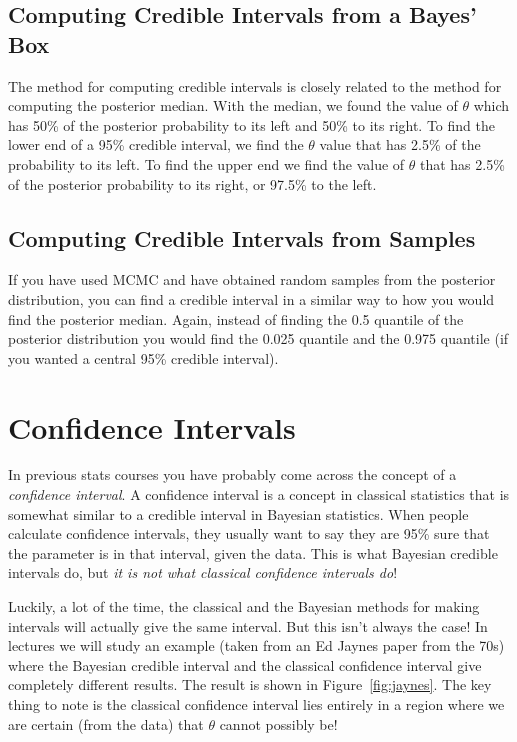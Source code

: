 \subsection{Computing Credible Intervals from a Bayes' Box}
The method for computing credible intervals is closely related to the method
for computing the posterior median. With the median, we found the value of
$\theta$ which has 50\% of the posterior probability to its left and 50\% to its
right. To find the lower end of a 95\% credible interval, we find the $\theta$
value that has 2.5\% of the probability to its left. To find the upper end we
find the value of $\theta$ that has 2.5\% of the posterior probability to its
right, or 97.5\% to the left.

\subsection{Computing Credible Intervals from Samples}
If you have used MCMC and have obtained random samples from the posterior
distribution, you can find a credible interval in a similar way to how you would
find the posterior median. Again, instead of finding the 0.5 quantile of the
posterior distribution you would find the 0.025 quantile and the 0.975 quantile
(if you wanted a central 95\% credible interval).

\section{Confidence Intervals}
In previous stats courses you have probably come across the concept of a
{\it confidence interval}. A confidence interval is a concept in classical
statistics that is somewhat similar to a credible interval in Bayesian statistics.
When people calculate confidence intervals, they usually want to say they are
95\% sure that the parameter is in that interval,
given the data. This is what Bayesian credible intervals do, but {\it it is not
what classical confidence intervals do}!

Luckily, a lot of the time, the classical and the Bayesian methods for making
intervals will actually give the same interval. But this isn't always the case!
In lectures we will study an example (taken from an Ed Jaynes paper from the
70s)
where the Bayesian credible interval and
the classical confidence interval give completely different results. The result
is shown in Figure~\ref{fig:jaynes}. The key thing to note is the classical
confidence interval lies entirely in a region where we are certain
(from the data) that $\theta$ cannot possibly be!

